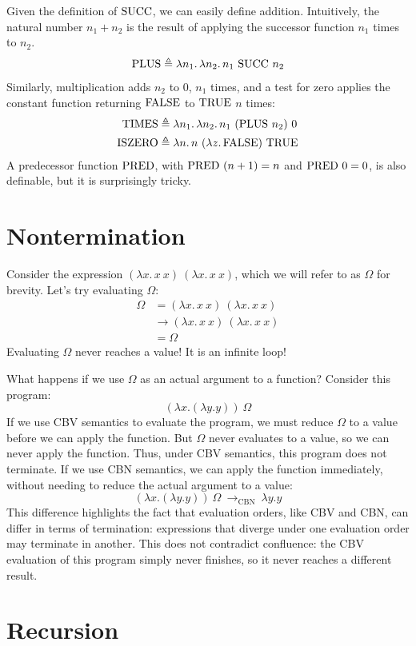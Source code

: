 Given the definition of $\mathrm{SUCC}$, we can easily define addition. Intuitively, the natural number
$n_1+n_2$ is the result of applying the successor function $n_1$ times to $n_2$.
\[
  \mathrm{PLUS}\triangleq\lambda n_1.\,\lambda n_2.\,n_1\ \mathrm{SUCC}\ n_2
\]
Similarly, multiplication adds $n_2$ to $0$, $n_1$ times, and a test for zero applies the constant
function returning $\mathrm{FALSE}$ to $\mathrm{TRUE}$ $n$ times:
\begin{align*}
  \TIMES&\triangleq\lambda n_1.\,\lambda n_2.\,n_1\ (\PLUS\ n_2)\ 0\\
  \ISZERO&\triangleq\lambda n.\,n\ (\lambda z.\,\fl)\ \tr
\end{align*}
A predecessor function $\mathrm{PRED}$, with $\mathrm{PRED}\ (n+1)=n$ and $\mathrm{PRED}\ 0=0$, is also definable, but it
is surprisingly tricky.

\section{Nontermination}\label{sec:nonterm}

Consider the expression $(\lambda x.\,x\ x)\ (\lambda x.\,x\ x)$, which we will refer to as
$\Omega$ for brevity. Let's try evaluating $\Omega$:
\begin{align*}
  \Omega&=(\lambda x.\,x\ x)\ (\lambda x.\,x\ x)\\
  &\to(\lambda x.\,x\ x)\ (\lambda x.\,x\ x)\\
  &=\Omega
\end{align*}
Evaluating $\Omega$ never reaches a value! It is an infinite loop!

What happens if we use $\Omega$ as an actual argument to a function? Consider this program:
\[
  (\lambda x.(\lambda y.y))\ \Omega
\]
If we use CBV semantics to evaluate the program, we must reduce $\Omega$ to a value before we can
apply the function. But $\Omega$ never evaluates to a value, so we can never apply the function.
Thus, under CBV semantics, this program does not terminate. If we use CBN semantics, we can apply
the function immediately, without needing to reduce the actual argument to a value:
\[
  (\lambda x.(\lambda y.y))\ \Omega\ \to_{\mathrm{CBN}}\ \lambda y.y
\]
This difference highlights the fact that evaluation orders, like CBV and CBN, can differ in terms of
termination: expressions that diverge under one evaluation order may terminate in another. This does
not contradict confluence: the CBV evaluation of this program simply never finishes, so it never
reaches a different result.

\section{Recursion}

